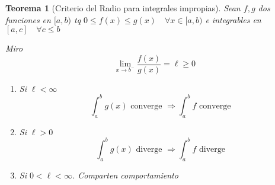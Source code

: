 \documentclass{article}
\theoremstyle{break}
\newtheorem{theorem}{Teorema}[section]
\begin{document}
\begin{theorem}[Criterio del Radio para integrales impropias]
	Sean $f,g$ dos funciones en $[a,b)$ tq $0 \leq f(x)\leq g(x) \quad \forall x\in [a,b)$ e 
	integrables en $[a,c] \quad \forall c \leq b$

	Miro \[ \lim_{x \rightarrow  b^- } \frac{f(x)}{g(x)} = \ell \geq 0\]

	\begin{enumerate}
		\item Si $\ell < \infty$ \[ \int_{a}^{b} g(x)\text{ converge } 
		\Longrightarrow \int_{a}^{b} f \text{ converge } \]
		\item Si $\ell > 0$ \[ \int_{a}^{b} g(x)\text{ diverge } 
		\Longrightarrow \int_{a}^{b} f \text{ diverge } \]
		\item Si $0 < \ell < \infty$. Comparten comportamiento
	\end{enumerate}
\end{theorem}
\end{document}
